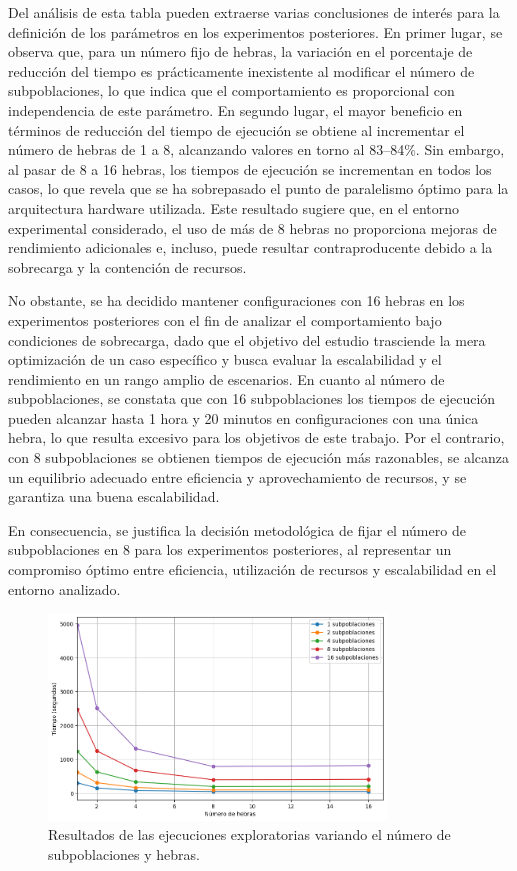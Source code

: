 Del análisis de esta tabla pueden extraerse varias conclusiones de interés para la definición de los parámetros en los experimentos posteriores. En primer lugar, se observa que, para un número fijo de hebras, la variación en el porcentaje de reducción del tiempo es prácticamente inexistente al modificar el número de subpoblaciones, lo que indica que el comportamiento es proporcional con independencia de este parámetro. En segundo lugar, el mayor beneficio en términos de reducción del tiempo de ejecución se obtiene al incrementar el número de hebras de 1 a 8, alcanzando valores en torno al 83--84\%. Sin embargo, al pasar de 8 a 16 hebras, los tiempos de ejecución se incrementan en todos los casos, lo que revela que se ha sobrepasado el punto de paralelismo óptimo para la arquitectura hardware utilizada. Este resultado sugiere que, en el entorno experimental considerado, el uso de más de 8 hebras no proporciona mejoras de rendimiento adicionales e, incluso, puede resultar contraproducente debido a la sobrecarga y la contención de recursos.

No obstante, se ha decidido mantener configuraciones con 16 hebras en los experimentos posteriores con el fin de analizar el comportamiento bajo condiciones de sobrecarga, dado que el objetivo del estudio trasciende la mera optimización de un caso específico y busca evaluar la escalabilidad y el rendimiento en un rango amplio de escenarios. En cuanto al número de subpoblaciones, se constata que con 16 subpoblaciones los tiempos de ejecución pueden alcanzar hasta 1 hora y 20 minutos en configuraciones con una única hebra, lo que resulta excesivo para los objetivos de este trabajo. Por el contrario, con 8 subpoblaciones se obtienen tiempos de ejecución más razonables, se alcanza un equilibrio adecuado entre eficiencia y aprovechamiento de recursos, y se garantiza una buena escalabilidad.

En consecuencia, se justifica la decisión metodológica de fijar el número de subpoblaciones en 8 para los experimentos posteriores, al representar un compromiso óptimo entre eficiencia, utilización de recursos y escalabilidad en el entorno analizado.

\begin{figure}[ht]
    \centering
    \includegraphics[width=0.8\textwidth]{imagenes/cap5/exploratory_subpopulations.png}
    \caption{Resultados de las ejecuciones exploratorias variando el número de subpoblaciones y hebras.}
    \label{fig:exploratory_subpopulations}
\end{figure}

